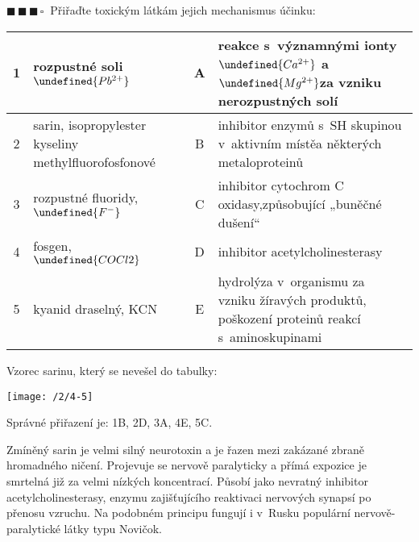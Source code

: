 \documentclass{book}
\let\ch\undefined
\newcommand{\tri}{$\blacksquare \, \blacksquare \, \blacksquare \, \square \; \; $}
\renewenvironment{quotation}{\par}{\par} %
\begin{document}
\newpage %
\begin{quotation}
\tri Přiřaďte toxickým látkám jejich mechanismus účinku:
\begin{center}
\begin{tabular}{c|p{4.8cm}||c|p{8cm}}

1 & rozpustné soli $\ch{Pb^{2+}}$ & A & reakce s~významnými ionty $\ch{Ca^{2+}}$ a $\ch{Mg^{2+}}$\newline\-za vzniku nerozpustných solí\tabularnewline
\hline 
2 & sarin, isopropylester kyseliny methylfluorofosfonové & B & inhibitor enzymů s~SH skupinou v~aktivním místě\newline\-a některých metaloproteinů\tabularnewline
\hline 
3 & rozpustné fluoridy, $\ch{F^{-}}$ & C & inhibitor cytochrom C oxidasy,\newline\-způsobující „buněčné dušení“\tabularnewline
\hline 
4 & fosgen, $\ch{COCl2}$ & D & inhibitor acetylcholinesterasy\newline\-\tabularnewline
\hline 
5 & kyanid draselný, KCN & E & hydrolýza v~organismu za vzniku žíravých produktů, poškození proteinů
reakcí s~aminoskupinami\tabularnewline

\end{tabular}
\end{center}
Vzorec sarinu, který se nevešel do tabulky:
\begin{center}
\texttt{[image: /2/4-5]}    
\end{center}
\end{quotation} \dotfill \par 

Správné přiřazení je: 1B, 2D, 3A, 4E, 5C.

Zmíněný sarin je velmi silný neurotoxin a je řazen mezi zakázané zbraně
hromadného ničení. Projevuje se nervově paralyticky a přímá expozice
je smrtelná již za velmi nízkých koncentrací. Působí jako nevratný
inhibitor acetylcholinesterasy, enzymu zajišťujícího reaktivaci nervových
synapsí po přenosu vzruchu. Na podobném principu fungují i v~Rusku populární nervově-paralytické látky typu Novičok.
\end{document}
